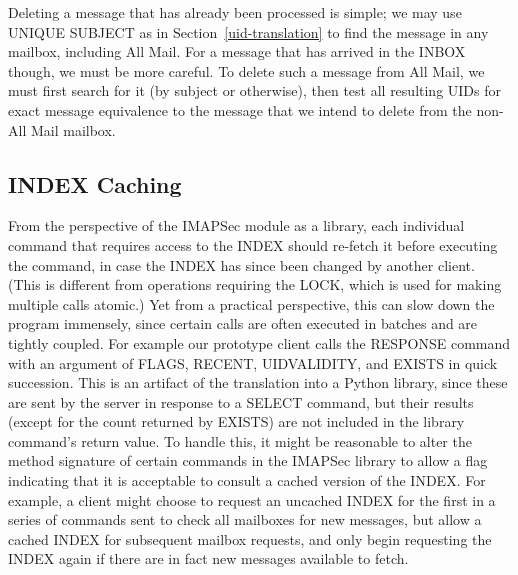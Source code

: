 \documentclass[pageno]{jpaper}
\newcommand{\project}{IMAPSec }
\begin{document}
Deleting a message that has already been processed is simple; we may use UNIQUE SUBJECT as in Section~\ref{uid-translation} to find the message in any mailbox, including All Mail. For a message that has arrived in the INBOX though, we must be more careful. To delete such a message from All Mail, we must first search for it (by subject or otherwise), then test all resulting UIDs for exact message equivalence to the message that we intend to delete from the non-All Mail mailbox.

\subsection{INDEX Caching}
From the perspective of the \project module as a library, each individual command that requires access to the INDEX should re-fetch it before executing the command, in case the INDEX has since been changed by another client. (This is different from operations requiring the LOCK, which is used for making multiple calls atomic.) Yet from a practical perspective, this can slow down the program immensely, since certain calls are often executed in batches and are tightly coupled. For example our prototype client calls the RESPONSE command with an argument of FLAGS, RECENT, UIDVALIDITY, and EXISTS in quick succession. This is an artifact of the translation into a Python library, since these are sent by the server in response to a SELECT command, but their results (except for the count returned by EXISTS) are not included in the library command's return value. To handle this, it might be reasonable to alter the method signature of certain commands in the \project library to allow a flag indicating that it is acceptable to consult a cached version of the INDEX. For example, a client might choose to request an uncached INDEX for the first in a series of commands sent to check all mailboxes for new messages, but allow a cached INDEX for subsequent mailbox requests, and only begin requesting the INDEX again if there are in fact new messages available to fetch.
\end{document}
